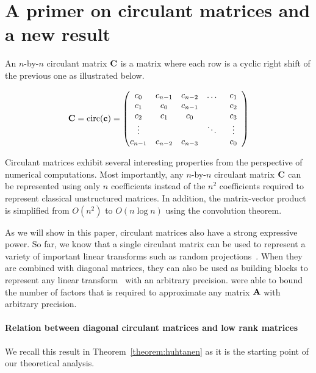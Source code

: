 \section{A primer on circulant matrices and a new result}
\label{section:circulant}

An $n$-by-$n$ circulant matrix $\mathbf{C}$ is a matrix where each row is a cyclic right shift of the previous one as illustrated below.

\begin{equation}
    \mathbf{C} = \mathrm{circ}(\mathbf{c}) = \begin{pmatrix}
    c_{0} & c_{n-1} & c_{n-2} & \dots & c_{1} \\
    c_{1} & c_{0} & c_{n-1} & & c_{2} \\
    c_{2} & c_{1} & c_{0}& & c_{3} \\
    \vdots & & & \ddots & \vdots \\
    c_{n-1} & c_{n-2} & c_{n-3} & & \phantom{0}c_{0}\phantom{0}
    \end{pmatrix}
\end{equation}

Circulant matrices exhibit several interesting properties from the perspective of numerical computations.
Most importantly, any $n$-by-$n$ circulant matrix $\mathbf{C}$ can be represented using only $n$ coefficients instead of the $n^2$ coefficients required to represent classical unstructured matrices.
In addition, the matrix-vector product is simplified from $O(n^2)$ to $O(n \log n)$ using the  convolution theorem.

As we will show in this paper, circulant matrices also have a strong expressive power.
So far, we know that a single circulant matrix can be used to represent a variety of important linear transforms such as random projections~\cite{hinrichs2011johnson}. 
When they are combined with diagonal matrices, they can also be used as building blocks to represent any linear transform~\cite{schmid2000decomposing, Huhtanen2015} with an arbitrary precision.
\citet{Huhtanen2015} were able to bound the number of factors that is required to approximate any matrix $\mathbf{A}$ with arbitrary precision.

\paragraph{Relation between diagonal circulant matrices and low rank matrices}
We recall this result in Theorem~\ref{theorem:huhtanen} as it is the starting point of our theoretical analysis.

